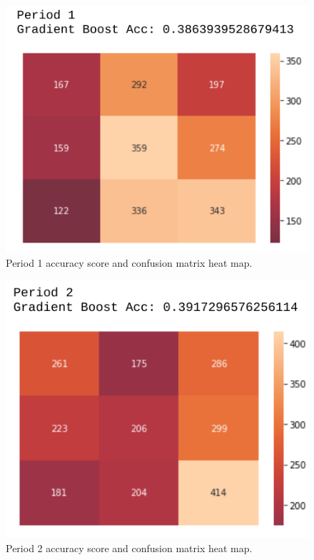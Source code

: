 \documentclass[twocolumn,letterpaper,12pt,notitlepage]{article}
\begin{document}
\begin{figure}[htp]
\centering
\includegraphics[width=\linewidth]{period1cm}
\caption{Period 1 accuracy score and confusion matrix heat map.}
\label{fig:3}
\end{figure}

\begin{figure}[htp]
\centering
\includegraphics[width=\linewidth]{period2cm}
\caption{Period 2 accuracy score and confusion matrix heat map.}
\label{fig:4}
\end{figure}
\end{document}
